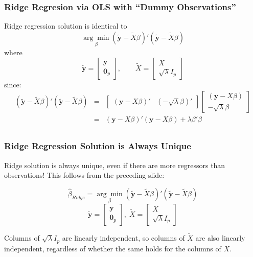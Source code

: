 \begin{frame}
  \frametitle{Ridge Regresion via OLS with ``Dummy Observations''}

  Ridge regression solution is identical to 
	$$\underset{\beta}{\arg \min} \left(\widetilde{\mathbf{y}} - \widetilde{X}\beta\right)'\left(\widetilde{\mathbf{y}} - \widetilde{X}\beta\right)$$
  where
$$\widetilde{\textbf{y}} = \left[ \begin{array}
	{c} \textbf{y} \\ \textbf{0}_p
\end{array}\right], \quad \quad \widetilde{X} = \left[ \begin{array}
	{c} X \\ \sqrt{\lambda} I_p
\end{array}\right]$$
since:
\begin{eqnarray*}
	\left(\widetilde{\mathbf{y}} - \widetilde{X}\beta\right)'\left(\widetilde{\mathbf{y}} - \widetilde{X}\beta\right) &=& \left[\begin{array}
		{cc} (\mathbf{y} - X\beta)' & (-\sqrt{\lambda}\beta)'
	\end{array} \right] \left[\begin{array}
		{c} (\mathbf{y} - X\beta) \\ -\sqrt{\lambda} \beta
	\end{array} \right]\\
		&=& (\mathbf{y} - X\beta)' (\mathbf{y} - X\beta) + \lambda \beta'\beta\\
\end{eqnarray*}
\end{frame}
\begin{frame}
  \frametitle{Ridge Regression Solution is Always Unique}

  Ridge solution is \alert{always unique}, even if there are more regressors than observations!
  This follows from the preceding slide:


$$ \widehat{\beta}_{Ridge} = \underset{\beta}{\arg \min} \left(\widetilde{\mathbf{y}} - \widetilde{X}\beta\right)'\left(\widetilde{\mathbf{y}} - \widetilde{X}\beta\right)$$
$$ \widetilde{\textbf{y}} = \left[ \begin{array}
	{c} \textbf{y} \\ \textbf{0}_p
\end{array}\right], \;  \widetilde{X} = \left[ \begin{array}
	{c} X \\ \sqrt{\lambda} I_p
\end{array}\right]$$

Columns of $\sqrt{\lambda}I_p$ are linearly independent, so columns of $\widetilde{X}$ are also linearly independent, \alert{regardless} of whether the same holds for the columns of $X$.

\end{frame}
